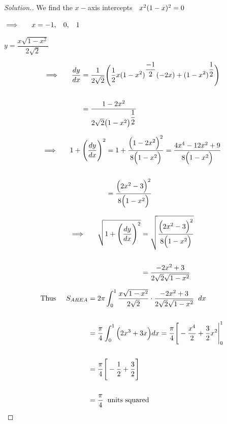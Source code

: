 \documentclass[11pt,a4paper]{article}
\theoremstyle{definition}
\newenvironment{solution}
  {\renewcommand{\qedsymbol}{}\begin{proof}[\textit{Solution}.]}
  {\end{proof}}
\begin{document}
\begin{solution}


We find the $x-$axis intercepts $\hspace{0.2cm} x^2 (1 - x)^2 = 0$


$\implies\hspace{0.5cm} x = -1,\hspace{0.3cm} 0, \hspace{0.3cm}  1$


$y  = \dfrac{x \sqrt{1 - x^2}}{2\sqrt{2}}$

\begin{align*}
\implies\hspace{0.5cm} \dfrac{dy}{dx} & = \dfrac{1}{2\sqrt{2}}\Bigg(\frac{1}{2} x (1 - x^2)^{\dfrac{-1}{2}}(-2x) + (1 - x^2)^{\dfrac{1}{2}}\Bigg)\\\\
& = \frac{1 - 2x^2}{2\sqrt{2}\big(1 - x^2\big)^{\dfrac{1}{2}}}\\
\end{align*}

\begin{align*}
\implies \hspace{0.5cm} 1 + \Bigg(\dfrac{dy}{dx}\Bigg)^2  & = 1 + \dfrac{\Big(1 - 2x^2\Big)^2}{8\Big(1 - x^2\Big)} = \frac{4x^4 - 12x^2 + 9}{8\Big( 1 - x^2\Big)}\\\\
& = \frac{\Big(2x^2 - 3\Big)^2}{8\Big(1 - x^2\Big)}\\
\end{align*}

\begin{align*}
\implies \hspace{0.5cm} \sqrt{ 1 + \Bigg(\dfrac{dy}{dx}\Bigg)^2} & = \sqrt{\dfrac{\Big(2x^2 - 3\Big)^2}{8\Big(1 - x^2\Big)}}\\\\
& = \dfrac{-2x^2 + 3}{2\sqrt{2}\sqrt{1 - x^2}}\\
\end{align*}

\begin{align*}
\text{Thus}\hspace{0.5cm} S_{AREA} & = 2\pi \int_0^1 \dfrac{x \sqrt{1 - x^2}}{2\sqrt{2}} \cdot \dfrac{-2x^2 + 3}{2\sqrt{2}\sqrt{1 - x^2}}\hspace{0.2cm}dx\\\\
& = \dfrac{\pi}{4}\int^1_0 \Big(2x^3 + 3x\Big)dx = \dfrac{\pi}{4}\Bigg[-\dfrac{x^4}{2} + \dfrac{3}{2}x^2\Bigg|^1_0\\\\
& = \dfrac{\pi}{4}\Bigg[-\dfrac{1}{2} + \dfrac{3}{2}\Bigg]\\\\
& = \dfrac{\pi}{4}\hspace{0.2cm}\text{units squared}\\
\end{align*}


\end{solution}
\end{document}
